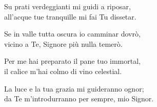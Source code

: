 

\spazio

\strofa Su prati verdeggianti mi guidi a riposar,\\
all'acque tue tranquille mi fai Tu dissetar.

\spazio


\spazio

\strofa Se in valle tutta oscura io camminar dovrò,\\
vicino a Te, Signore più nulla temerò.

\spazio


\spazio

\strofa Per me hai preparato il pane tuo immortal,\\
il calice m'hai colmo di vino celestial.

\spazio


\spazio

\strofa La luce e la tua grazia mi guideranno ognor;\\
da Te m'introdurranno per sempre, mio Signor.

\spazio

